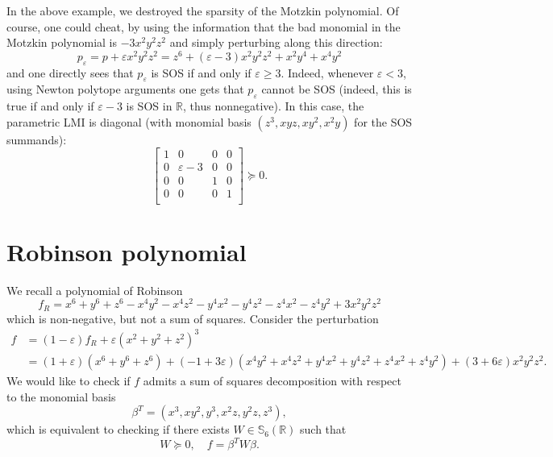 \documentclass[nonacm]{acmart}
\begin{document}
In the above example, we destroyed the sparsity of the Motzkin polynomial.
Of course, one could cheat,
by using the information that the bad monomial in the Motzkin
polynomial is $-3x^2y^2z^2$ and simply perturbing along this direction:
\begin{equation*}
    p_\varepsilon = p + \varepsilon x^2y^2z^2 = z^6+(\varepsilon-3)x^2y^2z^2+x^2y^4+x^4y^2
\end{equation*}
and one directly sees that $p_\varepsilon$ is SOS
if and only if $\varepsilon \geq 3$.
Indeed, whenever $\varepsilon < 3$,
using Newton polytope arguments one gets that $p_\varepsilon$ cannot be SOS
(indeed, this is true if and only if $\varepsilon-3$ is SOS in $\mathbb{R}$,
thus nonnegative).
In this case, the parametric LMI is diagonal
(with monomial basis $(z^3, xyz, xy^2, x^2y)$ for the SOS summands):
\begin{equation*}
    \begin{bmatrix}
        1 & 0             & 0 & 0 \\
        0 & \varepsilon-3 & 0 & 0 \\
        0 & 0             & 1 & 0 \\
        0 & 0             & 0 & 1 \\
    \end{bmatrix}
    \succeq 0.
\end{equation*}

\newpage

\section{Robinson polynomial}

We recall a polynomial of Robinson \cite{robinson1973some}
\begin{equation*}
    f_R = x^6 + y^6 + z^6 - x^4 y^2 - x^4 z^2 - y^4 x^2 - y^4 z^2 - z^4 x^2 - z^4 y^2 + 3 x^2 y^2 z^2
\end{equation*}
which is non-negative, but not a sum of squares.
Consider the perturbation
\begin{align*}
    f
     & = (1 - \varepsilon) f_R + \varepsilon (x^2 + y^2 + z^2)^3                                                                                                 \\
     & = (1 + \varepsilon) (x^6 + y^6 + z^6) + (-1 + 3\varepsilon) (x^4 y^2 + x^4 z^2 + y^4 x^2 + y^4 z^2 + z^4 x^2 + z^4 y^2) + (3 + 6\varepsilon) x^2 y^2 z^2.
\end{align*}
We would like to check if $f$ admits a sum of squares decomposition
with respect to the monomial basis
\begin{equation*}
    \beta^T
    = (x^3, x y^2, y^3, x^2 z, y^2 z, z^3),
\end{equation*}
which is equivalent to checking if there exists
$W\in\mathbb{S}_{6}(\mathbb{R})$
such that
\begin{equation*}
    W \succeq 0, \quad f = \beta^T W \beta.
\end{equation*}
\end{document}
